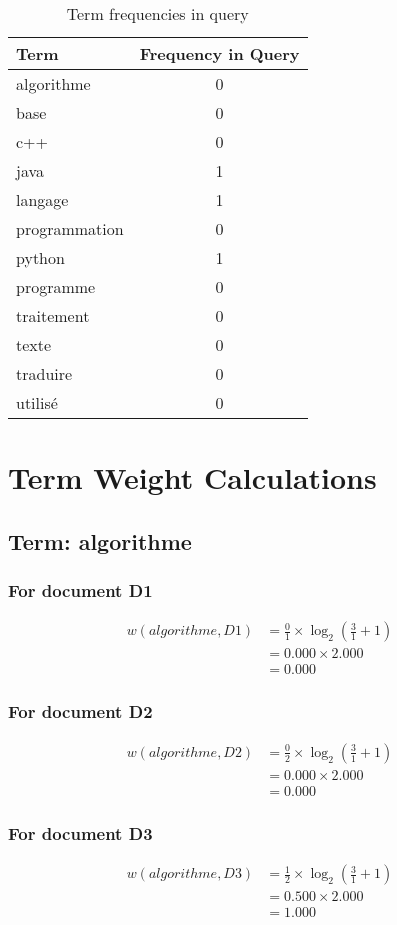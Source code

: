 \documentclass{article}
\begin{document}
\begin{table}[h]
\centering
\begin{tabular}{lc}
\toprule
Term & Frequency in Query \\
\midrule
algorithme & 0 \\
base & 0 \\
c++ & 0 \\
java & 1 \\
langage & 1 \\
programmation & 0 \\
python & 1 \\
programme & 0 \\
traitement & 0 \\
texte & 0 \\
traduire & 0 \\
utilis\'{e} & 0 \\
\bottomrule
\end{tabular}
\caption{Term frequencies in query}
\end{table}

\section{Term Weight Calculations}
\subsection{Term: algorithme}
\subsubsection*{For document D1}
\begin{align}
w(algorithme, D1) &= \frac{0}{1} \times \log_{2}\left(\frac{3}{1} + 1\right) \\
&= 0.000 \times 2.000 \\
&= 0.000
\end{align}

\subsubsection*{For document D2}
\begin{align}
w(algorithme, D2) &= \frac{0}{2} \times \log_{2}\left(\frac{3}{1} + 1\right) \\
&= 0.000 \times 2.000 \\
&= 0.000
\end{align}

\subsubsection*{For document D3}
\begin{align}
w(algorithme, D3) &= \frac{1}{2} \times \log_{2}\left(\frac{3}{1} + 1\right) \\
&= 0.500 \times 2.000 \\
&= 1.000
\end{align}
\end{document}
